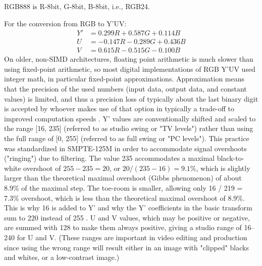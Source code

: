 \documentclass[a4paper,12pt,twoside]{article}
\begin{document}
RGB888 is R-8bit, G-8bit, B-8bit, i.e., RGB24.

For the conversion from RGB to Y'UV:
\begin{align}
  Y' &=  0.299 R + 0.587 G + 0.114 B \\
  U  &= -0.147 R - 0.289 G + 0.436 B \\
  V  &=  0.615 R - 0.515 G - 0.100 B
\end{align}
On older, non-SIMD architectures, floating point arithmetic is much slower than using fixed-point arithmetic, so most digital implementations of RGB \textrightarrow Y'UV used integer math, in particular fixed-point approximations. Approximation means that the precision of the used numbers (input data, output data, and constant values) is limited, and thus a precision loss of typically about the last binary digit is accepted by whoever makes use of that option in typically a trade-off to improved computation speeds \cite{enwiki:1114229318}. Y' values are conventionally shifted and scaled to the range [16, 235] (referred to as studio swing or "TV levels") rather than using the full range of [0, 255] (referred to as full swing or "PC levels"). This practice was standardized in SMPTE-125M in order to accommodate signal overshoots ("ringing") due to filtering. The value 235 accommodates a maximal black-to-white overshoot of $255 - 235 = 20$, or $20 / (235 - 16) = 9.1\%$, which is slightly larger than the theoretical maximal overshoot (Gibbs phenomenon) of about 8.9\% of the maximal step. The toe-room is smaller, allowing only 16 / 219 = 7.3\% overshoot, which is less than the theoretical maximal overshoot of 8.9\%. This is why 16 is added to Y' and why the Y' coefficients in the basic transform sum to 220 instead of 255 \cite{yuvjack}. U and V values, which may be positive or negative, are summed with 128 to make them always positive, giving a studio range of 16–240 for U and V. (These ranges are important in video editing and production since using the wrong range will result either in an image with "clipped" blacks and whites, or a low-contrast image.)
\end{document}
